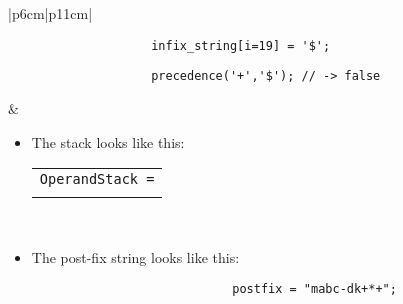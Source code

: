 \begin{center}
\begin{longtable}{ |p{6cm}|p{11cm}| }
            {
                \begin{verbatim}
                    infix_string[i=19] = '$';
                \end{verbatim}
            }
            {
                \begin{verbatim}
                    precedence('+','$'); // -> false
                \end{verbatim}
            }
            &
            \begin{itemize}
                \item The stack looks like this: 
                    {
                        \begin{center}
                            \begin{tabular}{ c }
                                \texttt{OperandStack =} \\ \\
                            \end{tabular}
                            \begin{bytefield}{10}
                                 \\
                            \end{bytefield}
                        \end{center}
                    }
                
                \item The post-fix string looks like this:
                    {
                        \begin{verbatim}
                            postfix = "mabc-dk+*+";
                        \end{verbatim}
                    }
            \end{itemize}
        \\ 
        \hline
        \hline
        

\end{longtable}
\end{center}
